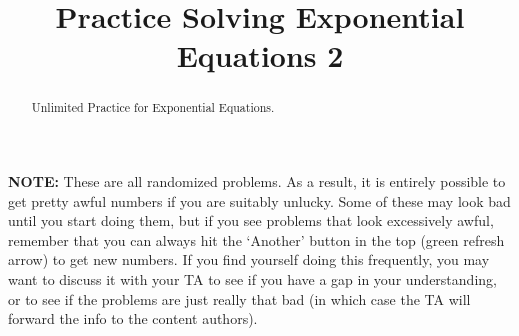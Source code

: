 \documentclass{ximera}
\title{Practice Solving Exponential Equations 2}
\begin{document}
\begin{abstract}
    Unlimited Practice for Exponential Equations.
\end{abstract}
\maketitle

\textbf{NOTE:} These are all randomized problems. As a result, it is entirely possible to get pretty awful numbers if you are suitably unlucky. Some of these may look bad until you start doing them, but if you see problems that look excessively awful, remember that you can always hit the `Another' button in the top (green refresh arrow) to get new numbers. If you find yourself doing this frequently, you may want to discuss it with your TA to see if you have a gap in your understanding, or to see if the problems are just really that bad (in which case the TA will forward the info to the content authors).

%
\end{document}
